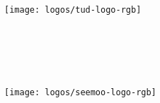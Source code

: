
\begin{titlepage}

    \begin{center}
        \large

        \texttt{[image: logos/tud-logo-rgb]}
        
        \vfill

        \begingroup
            \color{CTtitle}\spacedallcaps{\myTitle{}} \\ \bigskip
        \endgroup

        \vspace{2ex}

        \spacedlowsmallcaps{\myName{}}

        \vfill

        \myDegree{}

        \vspace{2ex}

        \myTime{}

        \vfill

        \myDepartment{} \\
        \myFaculty{} \\
        \myUni{}

        \vfill

        \texttt{[image: logos/seemoo-logo-rgb]}
    \end{center}
\end{titlepage}

